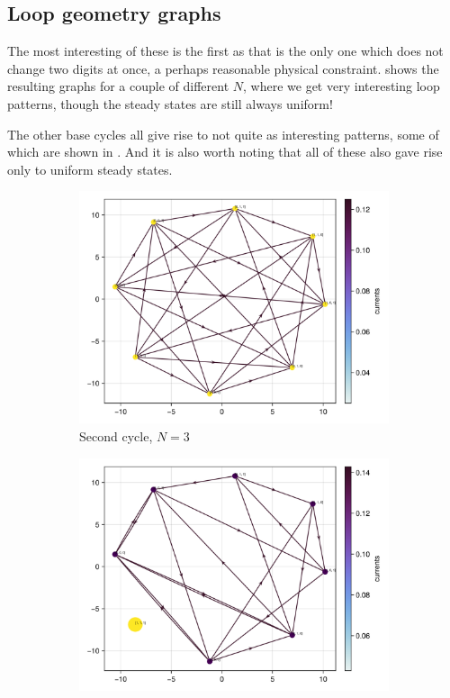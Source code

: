 \documentclass[11pt]{article}
\theoremstyle{nothm}
\begin{document}
\subsection{Loop geometry graphs}
The most interesting of these is the first as that is the only one which does not change two digits at once, a perhaps reasonable physical constraint.
 shows the resulting graphs for a couple of different $N$, where we get very interesting loop patterns, though the steady states are still always uniform!

The other base cycles all give rise to not quite as interesting patterns, some of which are shown in  .
And it is also worth noting that all of these also gave rise only to uniform steady states.

\begin{figure}[H]
    \centering
    \begin{subfigure}[t]{0.49\textwidth}
        \centering
        \includegraphics[width=\textwidth]{../../plots/ones/c2/spring_N=3_metadata=(chash=835941404624685282,ctype=simple).png}
        \caption{Second cycle, $N=3$}
    \end{subfigure}
    \begin{subfigure}[t]{0.49\textwidth}
        \centering
        \includegraphics[width=\textwidth]{../../plots/ones/c3/spring_N=3_metadata=(chash=14397644121192019449,ctype=simple).png}

\end{subfigure}
\end{figure}
\end{document}
